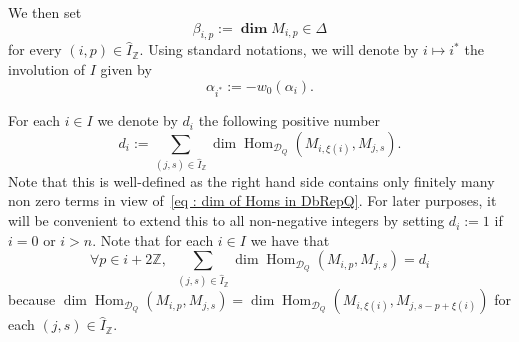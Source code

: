 \documentclass[12pt]{amsart}
\theoremstyle{plain}
\theoremstyle{definition}
\numberwithin{equation}{section}
\DeclareMathOperator{\Hom}{Hom}
\newcommand{\IZ}{\widehat{I}_{\mathbb{Z}}}
\newcommand{\ihat}{\widehat{\mathbf{i}}}
\newcommand{\DQ}{\mathcal{D}_Q}
\DeclareMathOperator*{\ind}{Ind}
\DeclareMathOperator*{\dimvec}{\mathbf{dim}}
\begin{document}
 We then set
$$ \beta_{i,p} := \dimvec M_{i,p} \in \Delta $$
for every $(i,p) \in \IZ$. 
Using standard notations, we will denote by $i \mapsto i^*$ the involution of $I$ given by
\begin{equation} \label{eq : def of istar}
 \alpha_{i^{*}} := - w_0 (\alpha_i). 
 \end{equation}

 
 For each $i \in I$ we denote by $d_i$ the following positive number
 \begin{equation} \label{eq : def of di}
 d_i := \sum_{(j,s) \in \IZ} \dim \Hom_{\DQ} (M_{i, \xi(i)} , M_{j,s}) .
 \end{equation}
 Note that this is well-defined as the right hand side contains only finitely many non zero terms in view of~\eqref{eq : dim of Homs in DbRepQ}. 
 For later purposes, it will be convenient to extend this to all non-negative integers by setting $d_i := 1$ if $i=0$ or $i>n$. Note that for each $i \in I$ we have that 
 $$ \forall p \in i + 2 \mathbb{Z}, \enspace \sum_{(j,s) \in \IZ} \dim \Hom_{\DQ}  (M_{i,p} , M_{j,s}) = d_i  $$
 because $\dim \Hom_{\DQ}(M_{i,p},M_{j,s}) = \dim \Hom_{\DQ}(M_{i,\xi(i)},M_{j,s-p+\xi(i)}) $ for each $(j,s) \in \IZ$. 
 
\end{document}

